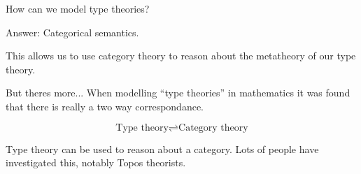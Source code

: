 \documentclass[usenames,dvipsnames]{beamer}
\begin{document}
    \begin{frame}{How can we model type theories?}
        \begin{block}{Answer:}
            Categorical semantics.
        \end{block}
        This allows us to use category theory to reason about the metatheory of our type theory.
        
        \begin{block}{But theres more...}
            When modelling ``type theories'' in mathematics it was found that there is really a two way correspondance.
            
            $$\text{Type theory} \rightleftharpoons \text{Category theory}$$
            
            Type theory can be used to reason about a category. Lots of people have investigated this, notably Topos theorists.
        \end{block}
        
    \end{frame}
    
    
    
    
    
    
    
    
\end{document}
